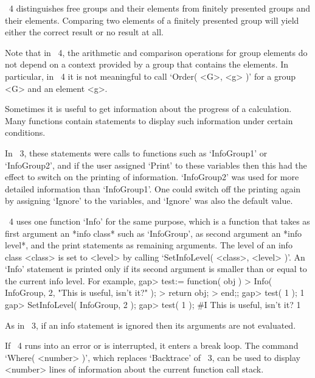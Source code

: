 {\GAP}~4 distinguishes free groups and their elements from finitely
presented groups and their elements.  Comparing two elements of a
finitely presented group will yield either the correct result or no
result at all.

Note that in {\GAP}~4, the arithmetic and comparison operations for
group elements do not depend on a context provided by a group that
contains the elements.  In particular, in {\GAP}~4 it is not
meaningful to call `Order( <G>, <g> )' for a group <G> and an element
<g>.



Sometimes it is useful to get information about the progress of a
calculation.
Many {\GAP} functions contain statements to display such information
under certain conditions.

In {\GAP}~3, these statements were calls to functions such as
`InfoGroup1' or `InfoGroup2', and if the user assigned `Print' to
these variables then this had the effect to switch on the printing of
information.
`InfoGroup2' was used for more detailed information than `InfoGroup1'.
One could switch off the printing again by assigning `Ignore' to the
variables, and `Ignore' was also the default value.

{\GAP}~4 uses one function `Info' for the same purpose,
which is a function that takes as first argument an *info class* such as
`InfoGroup', as second argument an *info level*, and the print statements
as remaining arguments.
The level of an info class <class> is set to <level> by calling
`SetInfoLevel( <class>, <level> )'.
An `Info' statement is printed only if its second argument is smaller than
or equal to the current info level.
For example,
\begintt
gap> test:= function( obj )
> Info( InfoGroup, 2, "This is useful, isn't it?" );
> return obj;
> end;;
gap> test( 1 );
1
gap> SetInfoLevel( InfoGroup, 2 );
gap> test( 1 );
#I  This is useful, isn't it?
1
\endtt

As in {\GAP}~3, if an info statement is ignored then its arguments are
not evaluated.



If {\GAP}~4 runs into an error or is interrupted,
it enters a break loop.
The command `Where( <number> )', which replaces `Backtrace' of {\GAP}~3,
can be used to display <number> lines of information about the current
function call stack.

